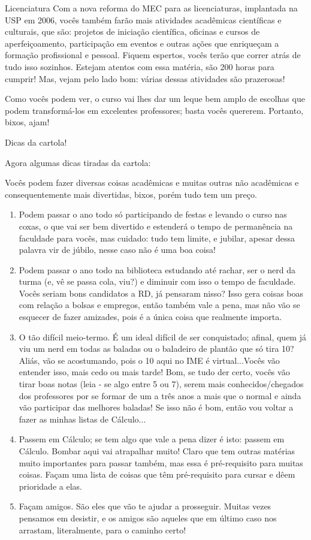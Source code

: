 \begin{subsecao}{Licenciatura}
Com a nova reforma do MEC para as licenciaturas, implantada na USP em 2006,
vocês também farão mais atividades acadêmicas científicas e culturais, que são:
projetos de iniciação científica, oficinas e cursos de aperfeiçoamento,
participação em eventos e outras ações que enriqueçam a formação profissional e
pessoal. Fiquem espertos, vocês terão que correr atrás de tudo isso sozinhos.
Estejam atentos com essa matéria, são 200 horas para cumprir! Mas, vejam pelo
lado bom: várias dessas atividades são prazerosas!

Como vocês podem ver, o curso vai lhes dar um leque bem amplo de escolhas que
podem transformá-los em excelentes professores; basta vocês quererem. Portanto,
bixos, ajam!

\begin{subsubsecao}{Dicas da cartola!}

Agora algumas dicas tiradas da cartola:

Vocês podem fazer diversas coisas acadêmicas e muitas outras não acadêmicas e
consequentemente mais divertidas, bixos, porém tudo tem um preço.

\begin{enumerate}
\item Podem passar o ano todo só participando de festas e levando o curso nas
  coxas, o que vai ser bem divertido e estenderá o tempo de permanência na
  faculdade para vocês, mas cuidado: tudo tem limite, e jubilar, apesar dessa
  palavra vir de júbilo, nesse caso não é uma boa coisa!
\item Podem passar o ano todo na biblioteca estudando até rachar, ser o nerd da
  turma (e, vê se passa cola, viu?) e diminuir com isso o tempo de faculdade.
  Vocês seriam bons candidatos a RD, já pensaram nisso? Isso gera coisas boas
  com relação a bolsas e empregos, então também vale a pena, mas não vão se
  esquecer de fazer amizades, pois é a única coisa que realmente importa.
\item O tão difícil meio-termo. É um ideal difícil de ser conquistado; afinal,
  quem já viu um nerd em todas as baladas ou o baladeiro de plantão que só tira
  10? Aliás, vão se acostumando, pois o 10 aqui no IME é virtual...Vocês vão
  entender isso, mais cedo ou mais tarde! Bom, se tudo der certo, vocês vão
  tirar boas notas (leia - se algo entre 5 ou 7), serem mais conhecidos/chegados
  dos professores por se formar de um a três anos a mais que o normal e ainda
  vão participar das melhores baladas! Se isso não é bom, então vou voltar a
  fazer as minhas listas de Cálculo...
\item Passem em Cálculo; se tem algo que vale a pena dizer é isto: passem em
  Cálculo. Bombar aqui vai atrapalhar muito! Claro que tem outras matérias muito
  importantes para passar também, mas essa é pré-requisito para muitas coisas.
  Façam uma lista de coisas que têm pré-requisito para cursar e dêem prioridade
  a elas.
\item Façam amigos. São eles que vão te ajudar a prosseguir. Muitas vezes
  pensamos em desistir, e os amigos são aqueles que em último caso nos arrastam,
  literalmente, para o caminho certo!


\end{enumerate}
\end{subsubsecao}
\end{subsecao}
